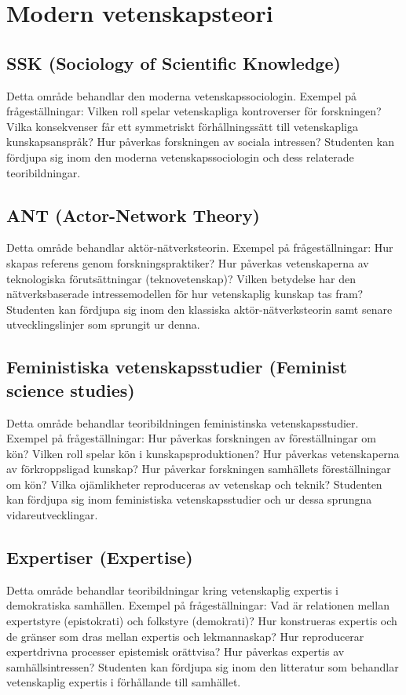 \documentclass[12pt,a4paper]{article}
\begin{document}
\section{Modern vetenskapsteori}

\subsection{SSK (Sociology of Scientific Knowledge)}
Detta område behandlar den moderna vetenskapssociologin. Exempel på frågeställningar: Vilken roll spelar vetenskapliga kontroverser för forskningen? Vilka konsekvenser får ett symmetriskt förhållningssätt till vetenskapliga kunskapsanspråk? Hur påverkas forskningen av sociala intressen? Studenten kan fördjupa sig inom den moderna vetenskapssociologin och dess relaterade teoribildningar.
 
\subsection{ANT (Actor-Network Theory)}
Detta område behandlar aktör-nätverksteorin. Exempel på frågeställningar: Hur skapas referens genom forskningspraktiker? Hur påverkas vetenskaperna av teknologiska förutsättningar (teknovetenskap)? Vilken betydelse har den nätverksbaserade intressemodellen för hur vetenskaplig kunskap tas fram? Studenten kan fördjupa sig inom den klassiska aktör-nätverksteorin samt senare utvecklingslinjer som  sprungit ur denna.  
 
\subsection{Feministiska vetenskapsstudier (Feminist science studies)}
Detta område behandlar teoribildningen feministinska vetenskapsstudier. Exempel på frågeställningar: Hur påverkas forskningen av föreställningar om kön? Vilken roll spelar kön i kunskapsproduktionen? Hur påverkas vetenskaperna av förkroppsligad kunskap? Hur påverkar forskningen samhällets föreställningar om kön? Vilka ojämlikheter reproduceras av vetenskap och teknik? Studenten kan fördjupa sig inom feministiska vetenskapsstudier och ur dessa sprungna vidareutvecklingar. 

\subsection{Expertiser (Expertise)} 
Detta område behandlar teoribildningar kring vetenskaplig expertis i demokratiska samhällen. Exempel på frågeställningar: Vad är relationen mellan expertstyre (epistokrati) och folkstyre (demokrati)? Hur konstrueras expertis och de gränser som dras mellan expertis och lekmannaskap? Hur reproducerar expertdrivna processer epistemisk orättvisa? Hur påverkas expertis av samhällsintressen? Studenten kan fördjupa sig inom den litteratur som behandlar vetenskaplig expertis i förhållande till samhället. 
\end{document}
